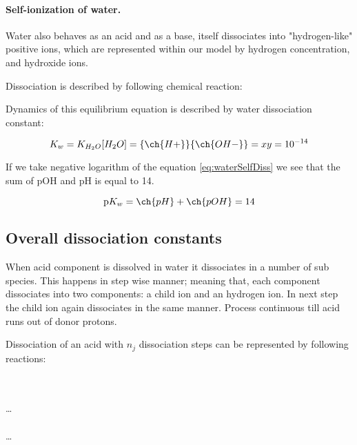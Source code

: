 \paragraph*{Self-ionization of water.} Water also behaves as an acid and as a base, itself dissociates into "hydrogen-like" positive ions, which are represented within our model
by hydrogen concentration, and hydroxide ions.

Dissociation is described by following chemical reaction:
\vspace{0.3cm}
\begin{center}
\end{center}
\vspace{0.3cm}

Dynamics of this equilibrium equation is described by water dissociation constant:

\begin{equation}\label{eq:waterSelfDiss}
    K_w = K_{H_2O}[H_2O] = \{\ch{H+}\}\{\ch{OH-}\} = xy = 10^{-14}
\end{equation}

If we take negative logarithm of the equation \ref{eq:waterSelfDiss} we see that the sum of pOH and pH is equal to 14.

\begin{equation}\label{eq:phPoh}
    \text{p}K_w = \ch{pH} + \ch{pOH} = 14
\end{equation}


\subsection{Overall dissociation constants}

When acid component is dissolved in water it dissociates in a number of sub species. This happens
in step wise manner; meaning that, each component dissociates into two components: a child ion and an hydrogen ion.
In next step the child ion again dissociates in the same manner. Process continuous till acid runs out
of donor protons.

Dissociation of an acid with $n_j$ dissociation steps can be represented by following reactions:

\vspace{0.3cm}
\begin{center}
    \noindent
     \\
     \\
    \dots \\
     \\
    \dots \\
\end{center}
\vspace{0.5cm}

